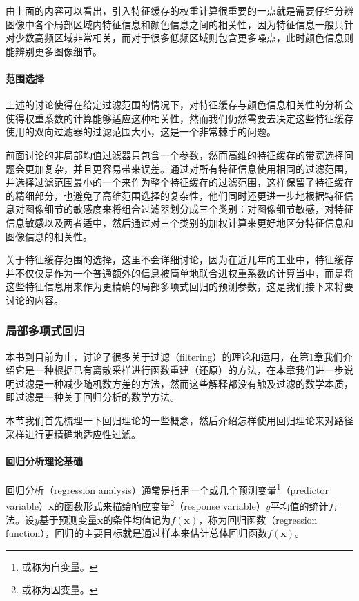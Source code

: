 由上面的内容可以看出，引入特征缓存的权重计算很重要的一点就是需要仔细分辨图像中各个局部区域内特征信息和颜色信息之间的相关性，因为特征信息一般只针对少数高频区域非常相关，而对于很多低频区域则包含更多噪点，此时颜色信息则能辨别更多图像细节。






\paragraph{范围选择}
上述的讨论使得在给定过滤范围的情况下，对特征缓存与颜色信息相关性的分析会使得权重系数的计算能够适应这种相关性，然而我们仍然需要去决定这些特征缓存使用的双向过滤器的过滤范围大小，这是一个非常棘手的问题。

前面讨论的非局部均值过滤器只包含一个参数，然而高维的特征缓存的带宽选择问题会更加复杂，并且更容易带来误差。\cite{a:RobustDenoisingusingFeatureandColorInformation}通过对所有特征信息使用相同的过滤范围，并选择过滤范围最小的一个来作为整个特征缓存的过滤范围，这样保留了特征缓存的精细部分，也避免了高维范围选择的复杂性，他们同时还更进一步地根据特征信息对图像细节的敏感度来将组合过滤器划分成三个类别：对图像细节敏感，对特征信息敏感以及两者适中，然后通过对三个类别的加权计算来更好地区分特征信息和图像信息的相关性。

关于特征缓存范围的选择，这里不会详细讨论，因为在近几年的工业中，特征缓存并不仅仅是作为一个普通额外的信息被简单地联合进权重系数的计算当中，而是将这些特征信息用来作为更精确的局部多项式回归的预测参数，这是我们接下来将要讨论的内容。






\subsubsection{局部多项式回归}\label{sec:pt-first-order-regression}
本书到目前为止，讨论了很多关于过滤（filtering）的理论和运用，在第1章我们介绍它是一种根据已有离散采样进行函数重建（还原）的方法，在本章我们进一步说明过滤是一种减少随机数方差的方法，然而这些解释都没有触及过滤的数学本质，即过滤是一种关于回归分析的数学方法。

本节我们首先梳理一下回归理论的一些概念，然后介绍怎样使用回归理论来对路径采样进行更精确地适应性过滤。







\paragraph{回归分析理论基础}
回归分析（regression analysis）通常是指用一个或几个预测变量\footnote{或称为自变量。}（predictor variable）$\mathbf{x}$的函数形式来描绘响应变量\footnote{或称为因变量。}（response variable）$y$平均值的统计方法。设$y$基于预测变量$\mathbf{x}$的条件均值记为$f(\mathbf{x})$，称为回归函数（regression function），回归的主要目标就是通过样本来估计总体回归函数$f(\mathbf{x})$。

